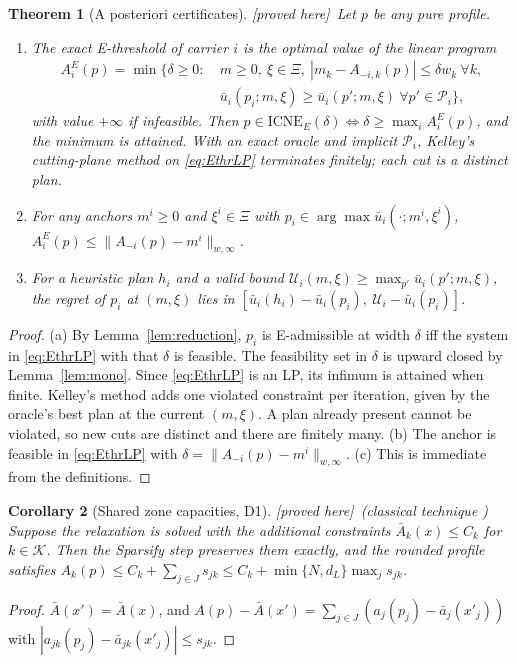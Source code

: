 \documentclass[11pt]{article}
\newtheorem{theorem}{Theorem}[section]
\newtheorem{corollary}[theorem]{Corollary}
\theoremstyle{definition}
\theoremstyle{remark}
\newcommand{\cP}{\mathcal{P}}
\newcommand{\ub}{\bar u}
\newcommand{\abar}{\bar a}
\newcommand{\Abar}{\bar A}
\newcommand{\ICNE}{\mathrm{ICNE}}
\newcommand{\PROVED}{\textsf{[proved here]}}
\begin{document}
\begin{theorem}[A posteriori certificates]\label{thm:cert} \PROVED\
Let $p$ be any pure profile.
\begin{enumerate}[label=(\alph*)]
\item The exact E-threshold of carrier $i$ is the optimal value of the linear program
\begin{equation}\label{eq:EthrLP}
\begin{aligned}A_i^E(p)=\min\{\delta\ge0:\ &m\ge0,\ \xi\in\Xi,\ |m_k-A_{-i,k}(p)|\le\delta w_k\ \forall k,\\ &\ub_i(p_i;m,\xi)\ge\ub_i(p';m,\xi)\ \forall p'\in\cP_i\},\end{aligned}
\end{equation}
with value $+\infty$ if infeasible. Then $p\in\ICNE_E(\delta)\iff\delta\ge\max_iA^E_i(p)$, and the minimum is attained. With an exact oracle and implicit $\cP_i$, Kelley's cutting-plane method on \eqref{eq:EthrLP} terminates finitely; each cut is a distinct plan.
\item For any anchors $m^i\ge0$ and $\xi^i\in\Xi$ with $p_i\in\arg\max\ub_i(\cdot;m^i,\xi^i)$, $A_i^E(p)\le\|A_{-i}(p)-m^i\|_{w,\infty}$.
\item For a heuristic plan $h_i$ and a valid bound $\mathcal U_i(m,\xi)\ge\max_{p'}\ub_i(p';m,\xi)$, the regret of $p_i$ at $(m,\xi)$ lies in $[\ub_i(h_i)-\ub_i(p_i),\ \mathcal U_i-\ub_i(p_i)]$.
\end{enumerate}
\end{theorem}
\begin{proof}
(a) By Lemma~\ref{lem:reduction}, $p_i$ is E-admissible at width $\delta$ iff the system in \eqref{eq:EthrLP} with that $\delta$ is feasible. The feasibility set in $\delta$ is upward closed by Lemma~\ref{lem:mono}. Since \eqref{eq:EthrLP} is an LP, its infimum is attained when finite. Kelley's method adds one violated constraint per iteration, given by the oracle's best plan at the current $(m,\xi)$. A plan already present cannot be violated, so new cuts are distinct and there are finitely many.
(b) The anchor is feasible in \eqref{eq:EthrLP} with $\delta=\|A_{-i}(p)-m^i\|_{w,\infty}$.
(c) This is immediate from the definitions.
\end{proof}

\begin{corollary}[Shared zone capacities, D1]\label{cor:cap} \PROVED\ (classical technique \cite{AE76})
Suppose the relaxation is solved with the additional constraints $\Abar_k(x)\le C_k$ for $k\in\mathcal K$. Then the Sparsify step preserves them exactly, and the rounded profile satisfies $A_k(p)\le C_k+\sum_{j\in J}s_{jk}\le C_k+\min\{N,d_L\}\max_js_{jk}$.
\end{corollary}
\begin{proof}
$\Abar(x')=\Abar(x)$, and $A(p)-\Abar(x')=\sum_{j\in J}(a_j(p_j)-\abar_j(x'_j))$ with $|a_{jk}(p_j)-\abar_{jk}(x'_j)|\le s_{jk}$.
\end{proof}
\end{document}
